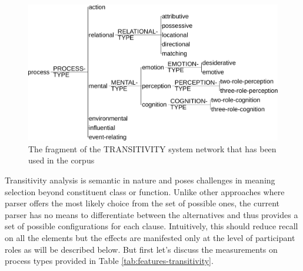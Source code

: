     \begin{figure}[!ht]
        \centering
        \includegraphics[width=.65\textwidth]{Figures/Evaluation/trans-simplified.pdf}
        \caption{The fragment of the TRANSITIVITY system network that has been used in the corpus}
        \label{fig:transitivity-simplified}
    \end{figure}

    Transitivity analysis is semantic in nature and poses challenges in meaning selection beyond constituent class or function. Unlike other approaches where parser offers the most likely choice from the set of possible ones, the current parser has no means to differentiate between the alternatives and thus provides a set of possible configurations for each clause. Intuitively, this should reduce recall on all the elements but the effects are manifested only at the level of participant roles as will be described below. But first let's discuss the measurements on process types provided in Table \ref{tab:features-transitivity}. 


